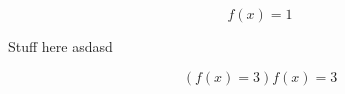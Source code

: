 \documentclass{minimal}
\begin{document}
\[
  f(x) = 1
\]

{Stuff here
  asdasd}

\begin{equation}
  \left(
    f(x) = 3
    \right)
  \left.
    f(x) = 3
    \right.
\end{equation}
\end{document}
